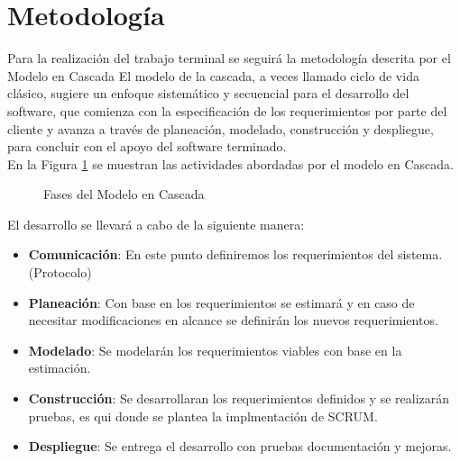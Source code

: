 \section{Metodología}
Para la realización del trabajo terminal se seguirá la metodología descrita por el Modelo en Cascada El modelo de la cascada, a veces llamado ciclo de vida clásico, sugiere un enfoque sistemático y secuencial para el desarrollo del software, que comienza con la especificación de los requerimientos por parte del cliente y avanza a través de planeación, modelado, construcción y despliegue, para concluir con el apoyo del software terminado. \cite{MetodoCascada} \\

En la Figura \ref{fig:IntroduccionMetodologiaC} se muestran las actividades abordadas por el modelo en Cascada.

\begin{figure}[htbp!]
	\centering
	\caption{Fases del Modelo en Cascada}
	\label{fig:IntroduccionMetodologiaC}
\end{figure}
\newpage

El desarrollo se llevará a cabo de la siguiente manera: \\

 \begin{itemize}
 	\item \textbf{Comunicación}: En este punto definiremos los requerimientos del sistema. (Protocolo)
 	\item \textbf{Planeación}: Con base en los requerimientos se estimará y en caso de necesitar modificaciones en alcance se definirán los nuevos requerimientos.
 	\item \textbf{Modelado}: Se modelarán los requerimientos viables con base en la estimación.
 	\item \textbf{Construcción}: Se desarrollaran los requerimientos definidos y se realizarán pruebas, es qui donde se plantea la implmentación de SCRUM.
 	\item \textbf{Despliegue}: Se entrega el desarrollo con pruebas documentación y mejoras. 
 \end{itemize}

